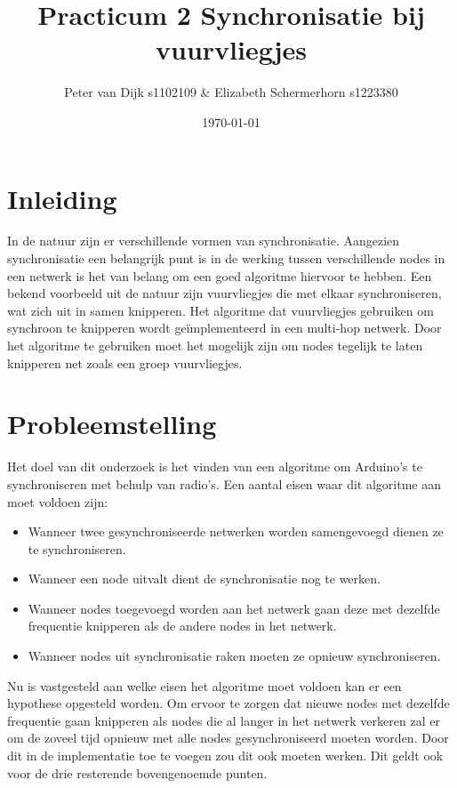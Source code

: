 \documentclass{article}
\author{Peter van Dijk s1102109 \& Elizabeth Schermerhorn s1223380}
\date{\today}
\title{Practicum 2 Synchronisatie bij vuurvliegjes}
\begin{document}
\maketitle
\newpage
\tableofcontents
\clearpage
\section{Inleiding}
In de natuur zijn er verschillende vormen van synchronisatie. Aangezien synchronisatie een belangrijk punt is in de werking tussen verschillende nodes in een netwerk is het van belang om een goed algoritme hiervoor te hebben. Een bekend voorbeeld uit de natuur zijn vuurvliegjes die met elkaar synchroniseren, wat zich uit in samen knipperen. Het algoritme dat vuurvliegjes gebruiken om synchroon te knipperen wordt ge\"{i}mplementeerd in een multi-hop netwerk. Door het algoritme te gebruiken moet het mogelijk zijn om nodes tegelijk te laten knipperen net zoals een groep vuurvliegjes. 
\section{Probleemstelling}
Het doel van dit onderzoek is het vinden van een algoritme om Arduino's te synchroniseren met behulp van radio's. Een aantal eisen waar dit algoritme aan moet voldoen zijn:
 \begin{itemize}
 \item Wanneer twee gesynchroniseerde netwerken worden samengevoegd dienen ze te synchroniseren.
 \item Wanneer een node uitvalt dient de synchronisatie nog te werken.
 \item Wanneer nodes toegevoegd worden aan het netwerk gaan deze met dezelfde frequentie knipperen als de andere nodes in het netwerk.
 \item Wanneer nodes uit synchronisatie raken moeten ze opnieuw synchroniseren. 
 \end{itemize}
Nu is vastgesteld aan welke eisen het algoritme moet voldoen kan er een hypothese opgesteld worden. Om ervoor te zorgen dat nieuwe nodes met dezelfde frequentie gaan knipperen als nodes die al langer in het netwerk verkeren zal er om de zoveel tijd opnieuw met alle nodes gesynchroniseerd moeten worden. Door dit in de implementatie toe te voegen zou dit ook moeten werken. Dit geldt ook voor de drie resterende bovengenoemde punten. 
\end{document}
